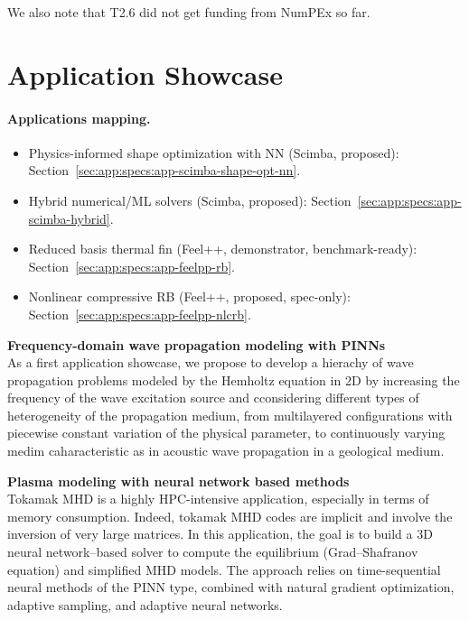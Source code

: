 We also note that T2.6  did not get funding from NumPEx so far.

\section{Application Showcase}
% 
%  

\paragraph{Applications mapping.}
\begin{itemize}
  \item Physics-informed shape optimization with NN (Scimba, proposed): Section~\ref{sec:app:specs:app-scimba-shape-opt-nn}.
  \item Hybrid numerical/ML solvers (Scimba, proposed): Section~\ref{sec:app:specs:app-scimba-hybrid}.
  \item Reduced basis thermal fin (Feel++, demonstrator, benchmark-ready): Section~\ref{sec:app:specs:app-feelpp-rb}.
  \item Nonlinear compressive RB (Feel++, proposed, spec-only): Section~\ref{sec:app:specs:app-feelpp-nlcrb}.
\end{itemize}

\textbf{Frequency-domain wave propagation modeling with PINNs} \\

As a first  application showcase, we propose to develop  a hierachy of
wave propagation  problems modeled by  the Hemholtz equation in  2D by
increasing   the  frequency   of  the   wave  excitation   source  and
cconsidering  different  types  of heterogeneity  of  the  propagation
medium,  from  multilayered  configurations  with  piecewise  constant
variation  of the  physical parameter,  to continuously  varying medim
caharacteristic  as  in  acoustic  wave propagation  in  a  geological
medium.

\textbf{Plasma modeling with neural network based methods }\\

Tokamak MHD is a highly HPC-intensive application, especially in terms
of  memory consumption.  Indeed, tokamak  MHD codes  are implicit  and
involve the inversion of very large matrices. In this application, the
goal  is to  build a  3D neural  network–based solver  to compute  the
equilibrium (Grad–Shafranov  equation) and simplified MHD  models. The
approach relies  on time-sequential neural  methods of the  PINN type,
combined with  natural gradient  optimization, adaptive  sampling, and
adaptive neural networks.


